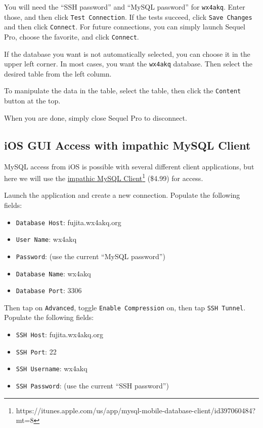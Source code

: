 \documentclass[pdflatex,letterpaper,twoside,12pt]{book}
\begin{document}
You will need the ``SSH password'' and ``MySQL password'' for \texttt{wx4akq}.  Enter those, and then click \texttt{Test Connection}.  If the tests succeed, click \texttt{Save Changes} and then click \texttt{Connect}.  For future connections, you can simply launch Sequel Pro, choose the favorite, and click \texttt{Connect}.

If the database you want is not automatically selected, you can choose it in the upper left corner.  In most cases, you want the \texttt{wx4akq} database.  Then select the desired table from the left column.

To manipulate the data in the table, select the table, then click the \texttt{Content} button at the top.

When you are done, simply close Sequel Pro to disconnect.

\subsection{iOS GUI Access with impathic MySQL Client}

MySQL access from iOS is possible with several different client applications, but here we will use the \href{https://itunes.apple.com/us/app/mysql-mobile-database-client/id397060484?mt=8}{impathic MySQL Client}\footnote{https://itunes.apple.com/us/app/mysql-mobile-database-client/id397060484?mt=8} (\$4.99) for access.

Launch the application and create a new connection.  Populate the following fields:

\begin{itemize}
\item \texttt{Database Host}: fujita.wx4akq.org
\item \texttt{User Name}: wx4akq
\item \texttt{Password}: (use the current ``MySQL password'')
\item \texttt{Database Name}: wx4akq
\item \texttt{Database Port}: 3306
\end{itemize}

Then tap on \texttt{Advanced}, toggle \texttt{Enable Compression} on, then tap \texttt{SSH Tunnel}.  Populate the following fields:

\begin{itemize}
\item \texttt{SSH Host}: fujita.wx4akq.org
\item \texttt{SSH Port}: 22
\item \texttt{SSH Username}: wx4akq
\item \texttt{SSH Password}: (use the current ``SSH password'')
\end{itemize}
\end{document}
